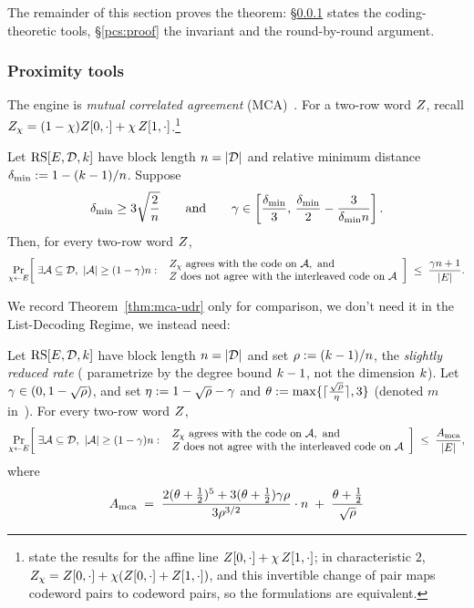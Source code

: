 The remainder of this section proves the theorem: \S\ref{sec:tools} states the coding-theoretic tools, \S\ref{pcs:proof} the invariant and the round-by-round argument.

\subsubsection{Proximity tools}\label{sec:tools}

The engine is \emph{mutual correlated agreement} (MCA)~\cite{ACFY25}. For a two-row word $Z$, recall $Z_\chi = (1-\chi)Z[0,\cdot] + \chi\,Z[1,\cdot]$.\footnote{\cite{BCHKS25} state the results for the affine line $Z[0,\cdot] + \chi\,Z[1,\cdot]$; in characteristic $2$, $Z_\chi = Z[0,\cdot] + \chi(Z[0,\cdot] + Z[1,\cdot])$, and this invertible change of pair maps codeword pairs to codeword pairs, so the formulations are equivalent.}

\begin{theorem}\label{thm:mca-udr}
Let $\mathrm{RS}[E,\mathcal{D},k]$ have block length $n = |\mathcal{D}|$ and relative minimum distance $\delta_{\min} := 1 - (k-1)/n$. Suppose
\[
\delta_{\min} \ge 3\sqrt{\frac{2}{n}}
\qquad\text{and}\qquad
\gamma \in \left[\frac{\delta_{\min}}{3},\,\frac{\delta_{\min}}{2} - \frac{3}{\delta_{\min} n}\right].
\]
Then, for every two-row word $Z$,
\[
\Pr_{\chi \leftarrow E}\!\left[\; \exists \mathcal{A} \subseteq \mathcal{D},\ |\mathcal{A}| \ge (1-\gamma) n :\ \begin{array}{l} Z_\chi \text{ agrees with the code on } \mathcal{A}, \text{ and} \\ Z \text{ does not agree with the interleaved code on } \mathcal{A} \end{array} \right]
\;\le\; \frac{\gamma n + 1}{|E|}.
\]
\end{theorem}

We record Theorem~\ref{thm:mca-udr} only for comparison, we don't need it in the List-Decoding Regime, we instead need:

\begin{theorem}\label{thm:mca-johnson}
Let $\mathrm{RS}[E,\mathcal{D},k]$ have block length $n = |\mathcal{D}|$ and set $\rho := (k-1)/n$, the \emph{slightly reduced rate} (\cite{BCHKS25} parametrize by the degree bound $k - 1$, not the dimension $k$). Let $\gamma \in (0, 1-\sqrt{\rho})$, and set $\eta := 1 - \sqrt{\rho} - \gamma$ and $\theta := \max\{\lceil \tfrac{\sqrt{\rho}}{\eta} \rceil, 3\}$ (denoted $m$ in~\cite{BCHKS25}). For every two-row word $Z$,
\[
\Pr_{\chi \leftarrow E}\!\left[\; \exists \mathcal{A} \subseteq \mathcal{D},\ |\mathcal{A}| \ge (1-\gamma) n :\ \begin{array}{l} Z_\chi \text{ agrees with the code on } \mathcal{A}, \text{ and} \\ Z \text{ does not agree with the interleaved code on } \mathcal{A} \end{array} \right] \;\le\; \frac{A_{\mathrm{mca}}}{|E|},
\]
where
\[
A_{\mathrm{mca}} \;=\; \frac{2(\theta + \tfrac12)^5 + 3(\theta + \tfrac12)\gamma\rho}{3\rho^{3/2}} \cdot n \;+\; \frac{\theta + \tfrac12}{\sqrt{\rho}}
\]
\end{theorem}

